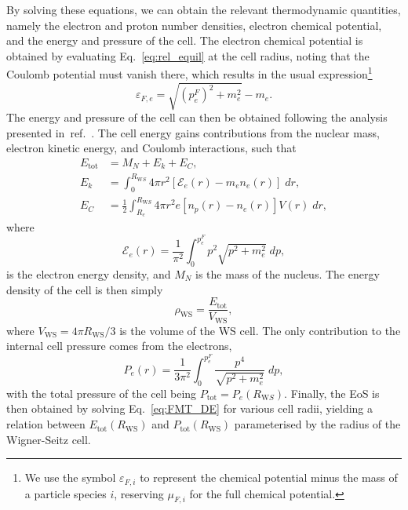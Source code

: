 By solving these equations, we can obtain the relevant thermodynamic quantities, namely the electron and proton number densities, electron chemical potential, and the energy and pressure of the cell. The electron chemical potential is obtained by evaluating Eq.~\ref{eq:rel_equil} at the cell radius, noting that the Coulomb potential must vanish there, which results in the usual expression\footnote{We use the symbol $\varepsilon_{F,i}$ to represent the chemical potential minus the mass of a particle species $i$, reserving $\mu_{F,i}$ for the full chemical potential.}
\begin{equation}
    \varepsilon_{F,e} = \sqrt{(p_e^F)^2+m_e^2}-m_e.\label{eq:mufe}
\end{equation}
The energy and pressure of the cell can then be obtained following the analysis presented in~ref.~\cite{Rotondo:2011zz_RelativisticFeynmanMetropolisTellertheory}. The cell energy gains contributions from the nuclear mass, electron kinetic energy, and Coulomb interactions, such that
\begin{align}
    E_\mathrm{tot} & = M_N + E_k + E_C,\label{eq:total_E_cell}\\
    E_k & = \int_0^{R_{\mathrm WS}}4\pi r^2 [\mathcal{E}_e(r) - m_e n_e(r)]\;dr,\label{eq:kinetic_E_cell}\\
    E_C & = \frac{1}{2}\int_{R_c}^{R_{\mathrm WS}}4\pi r^2 e[n_p(r) - n_e(r)]V(r)\;dr,\label{eq:Coulomb_E_cell}
\end{align}
where
\begin{equation}
    \mathcal{E}_e(r) = \frac{1}{\pi^2}\int_0^{p_e^F}p^2\sqrt{p^2 + m_e^2}\;dp,
\end{equation}
is the electron energy density, and  $M_N$ is the mass of the nucleus. The energy density of the cell is then simply
\begin{equation}
    \rho_\mathrm{WS} = \frac{E_\mathrm{tot}}{V_\mathrm{WS}},
\end{equation} 
where $V_\mathrm{WS} = 4\pi R_\mathrm{WS}/3$ is the volume of the WS cell. 
The only contribution to the internal cell pressure comes from the electrons,
\begin{equation}
    P_e(r) = \frac{1}{3\pi^2}\int_0^{p_e^F}\frac{p^4}{\sqrt{p^2+m_e^2}}\;dp,
\end{equation}
with the total pressure of the cell being $P_\mathrm{tot} = P_e(R_{\mathrm WS})$.
Finally, the EoS is then obtained by solving Eq.~\ref{eq:FMT_DE} for various cell radii, yielding a relation between $E_\mathrm{tot}(R_\mathrm{WS})$ and $P_\mathrm{tot}(R_\mathrm{WS})$ parameterised by the radius of the Wigner-Seitz cell. 


